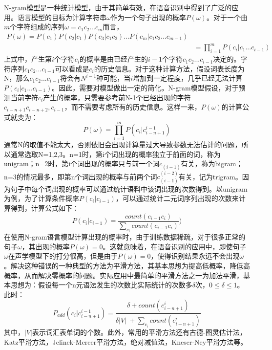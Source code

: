 N-gram模型是一种统计模型，由于其简单有效，在语音识别中得到了广泛的应用。语言模型的目标为计算字符串$\omega$作为一个句子出现的概率$P(\omega)$。对于一个由$m$个字符组成的序列$\omega=c_1 c_2...c_m$而言，
\begin{eqnarray}
  P(\omega) = P(c_1)P(c_2|c_1)P(c_3|c_1 c_2)...P(c_m|c_1 c_2...c_{m-1}) \\
          & = \prod\limits_{i=1}^m P(c_i|c_1...c_{i-1})
\end{eqnarray}
上式中，产生第$i$个字符$c_i$的概率是由已经产生的$i-1$个字符$c_1 c_2...c_{i-1}$决定的。字符序列$c_1 c_2...c_{i-1}$可以看成是$c_i$的历史信息。对于这种计算方法，假设词表长度为N，那么$c_1 c_2...c_{i-1}$将会有$N^{i-1}$种可能，当$i$增加到一定程度，几乎已经无法计算$P(c_i|c_1...c_{i-1})$。因此，需要对模型做出一定的简化。N-gram模型假设，对于预测当前字符$c_i$产生的概率，只需要参考前N-1个已经出现的字符$c_{i-n+1} c_{i-n+2}, c_{i-1}$，而不需要考虑所有的历史信息。这样一来，$P(\omega)$的计算公式就变为：
\begin{equation}P(\omega) = \prod\limits_{i=1}^m P(c_i|c_{i-n+1}^{i-1})\end{equation}
通常N的取值不能太大，否则依旧会出现计算量过大导致参数无法估计的问题，所以通常选取N=1,2,3。n=1时，第i个词出现的概率独立于前面的词，称为unigram；n=2时，第i个词出现的概率只与前一个词$c_(i-1)$有关，称为bigram；n=3的情况最多，即第n个词出现的概率与前两个词$c_(i-1)^(i-2)$有关，记为trigram。因为句子中每个词出现的概率可以通过统计语料中该词出现的次数得到。以unigram为例，为了计算条件概率$P(c_i|c_{i-1})$，可以通过统计二元词序列出现的次数来计算得到，计算公式如下：
\begin{equation}P(c_i|c_{i-1})=\frac{count(c_{i-1} c_i)}{\sum\limits_{c_i} count(c_{i-1} c_i)})\end{equation}
在使用N-gram语言模型计算出现的概率时，由于训练数据稀疏，对于很多正常的句子$\omega$，其出现的概率$P(\omega)=0$。这就意味着，在语音识别的应用中，即使句子$\omega$在声学模型下的打分很高，但是由于$P(\omega)=0$，使得识别结果永远不会出现$\omega$。解决这种错误的一种典型的方法为平滑方法，其基本思想为提高低概率，降低高概率，从而解决零概率的问题。实际应用中最简单的平滑方法之一为加法平滑，基本思想为：假设每一个n元语法发生的次数比实际统计的次数多$\delta$次，$0\leqslant \delta \leqslant 1$。此时：
\begin{equation}P_{add}(c_i|c_{i-n+1}^{i-1})=\frac{\delta+count(c_{i-n+1}^{i})}{\delta \lvert V\rvert\ + \sum\limits_{c_i} count(c_{i-n+1}^i)}\end{equation}
其中，$\lvert V\rvert$表示词汇表单词的个数。此外，常用的平滑方法还有古德-图灵估计法，Katz平滑方法，Jelinek-Mercer平滑方法，绝对减值法，Kneser-Ney平滑方法等\cite{goodman2001bit}。

